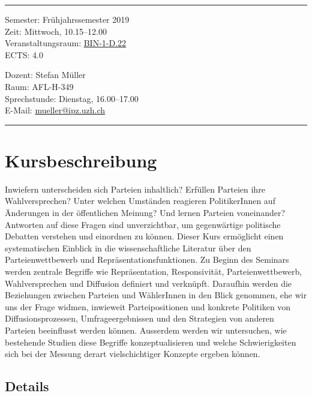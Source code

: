 \documentclass[abstract=on,parskip=full,headings=standardclasses,fontsize=11pt,paper=a4]{scrartcl}
\begin{document}
\hrule
\medskip
\begin{minipage}[t]{0.5\textwidth}
Semester: Frühjahrssemester 2019 \\
Zeit: Mittwoch, 10.15--12.00 \\
Veranstaltungsraum:  \href{https://www.plaene.uzh.ch/BIN}{BIN-1-D.22} \\
ECTS: 4.0
\end{minipage}
\begin{minipage}[t]{0.49\textwidth}
\begin{flushright}
Dozent: Stefan Müller \\
Raum: AFL-H-349\\
Sprechstunde: Dienstag, 16.00--17.00 \\
E-Mail: \textsf{\href{mailto:mueller@ipz.uzh.ch}{mueller@ipz.uzh.ch}}
\end{flushright}
\end{minipage}
\medskip
\vspace{2.5mm}
\hrule 

\section*{Kursbeschreibung}

Inwiefern unterscheiden sich Parteien inhaltlich? Erfüllen Parteien ihre Wahlversprechen? Unter welchen Umständen reagieren PolitikerInnen auf Änderungen in der öffentlichen Meinung? Und lernen Parteien voneinander? Antworten auf diese Fragen sind unverzichtbar, um gegenwärtige politische Debatten verstehen und einordnen zu können. Dieser Kurs ermöglicht einen systematischen Einblick in die wissenschaftliche Literatur über den Parteienwettbewerb und Repräsentationsfunktionen. Zu Beginn des Seminars werden zentrale Begriffe wie Repräsentation, Responsivität, Parteienwettbewerb, Wahlversprechen und Diffusion definiert und verknüpft. Daraufhin werden die Beziehungen zwischen Parteien und WählerInnen in den Blick genommen, ehe wir uns der Frage widmen, inwieweit Parteipositionen und konkrete Politiken von Diffusionsprozessen, Umfrageergebnissen und den Strategien von anderen Parteien beeinflusst werden können. Ausserdem werden wir untersuchen, wie bestehende Studien diese Begriffe konzeptualisieren und welche Schwierigkeiten sich bei der Messung derart vielschichtiger Konzepte ergeben können.

\subsection*{Details}
\end{document}

